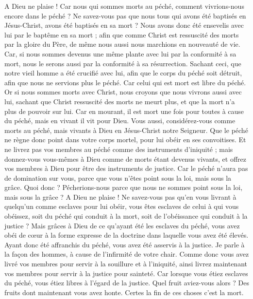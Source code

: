 \begin{multicols}{2}
A Dieu ne plaise ! Car nous qui sommes morts au péché, comment vivrions-nous encore dans le péché ?
Ne savez-vous pas que nous tous qui avons été baptisés en Jésus-Christ, avons été baptisés en sa mort ?
Nous avons donc été ensevelis avec lui par le baptême en sa mort ; afin que comme Christ est ressuscité des morts par la gloire du Père, de même nous aussi nous marchions en nouveauté de vie.
Car, si nous sommes devenus une même plante avec lui par la conformité à sa mort, nous le serons aussi par la conformité à sa résurrection.
Sachant ceci, que notre vieil homme a été crucifié avec lui, afin que le corps du péché soit détruit, afin que nous ne servions plus le péché.
Car celui qui est mort est libre du péché.
Or si nous sommes morts avec Christ, nous croyons que nous vivrons aussi avec lui,
sachant que Christ ressuscité des morts ne meurt plus, et que la mort n'a plus de pouvoir sur lui.
Car en mourant, il est mort une fois pour toutes à cause du péché, mais en vivant il vit pour Dieu.
Vous aussi, considérez-vous comme morts au péché, mais vivants à Dieu en Jésus-Christ notre Seigneur.
Que le péché ne règne donc point dans votre corps mortel, pour lui obéir en ses convoitises.
Et ne livrez pas vos membres au péché comme des instruments d'iniquité ; mais donnez-vous vous-mêmes à Dieu comme de morts étant devenus vivants, et offrez vos membres à Dieu pour être des instruments de justice.
Car le péché n'aura pas de domination sur vous, parce que vous n'êtes point sous la loi, mais sous la grâce.
Quoi donc ? Pécherions-nous parce que nous ne sommes point sous la loi, mais sous la grâce ? A Dieu ne plaise !
Ne savez-vous pas qu’en vous livrant à quelqu’un comme esclaves pour lui obéir, vous êtes esclaves de celui à qui vous obéissez, soit du péché qui conduit à la mort, soit de l'obéissance qui conduit à la justice ?
Mais grâces à Dieu de ce qu'ayant été les esclaves du péché, vous avez obéi de cœur à la forme expresse de la doctrine dans laquelle vous avez été élevés.
Ayant donc été affranchis du péché, vous avez été asservis à la justice.
Je parle à la façon des hommes, à cause de l'infirmité de votre chair. Comme donc vous avez livré vos membres pour servir à la souillure et à l’iniquité, ainsi livrez maintenant vos membres pour servir à la justice pour sainteté.
Car lorsque vous étiez esclaves du péché, vous étiez libres à l'égard de la justice.
Quel fruit aviez-vous alors ? Des fruits dont maintenant vous avez honte. Certes la fin de ces choses c’est la mort.

\end{multicols}

